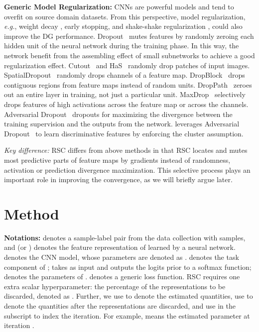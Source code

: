 \documentclass[runningheads]{llncs}
\newcommand{\method}{RSC}
\begin{document}
\textbf{Generic Model Regularization:} CNNs are powerful models and tend to overfit on source domain datasets. From this perspective, model regularization, \textit{e.g.}, weight decay \cite{nowlan1992simplifying}, early stopping, and shake-shake regularization \cite{gastaldi2017shake}, could also improve the DG performance. 
Dropout~\cite{srivastava2014dropout} mutes features by randomly zeroing each hidden unit of the neural network during the training phase. In this way, the network benefit from the assembling effect of small subnetworks to achieve a good regularization effect. Cutout~\cite{devries2017improved} and HaS~\cite{singh2017hide} randomly drop patches of input images. SpatialDropout~\cite{tompson2015efficient} randomly drops channels of a feature map. DropBlock~\cite{ghiasi2018dropblock} drops contiguous regions from feature maps instead of random units.
DropPath~\cite{larsson2016fractalnet} zeroes out an entire layer in training, not just a particular unit. MaxDrop~\cite{park2016analysis} selectively drops features of high activations across the feature map or across the channels. Adversarial Dropout~\cite{park2018adversarial} dropouts for maximizing the divergence between the training supervision and the outputs from the network. \cite{lee2019drop} leverages Adversarial Dropout~\cite{park2018adversarial} to learn discriminative features by enforcing the cluster assumption.


\emph{Key difference:} RSC differs from above methods in that RSC locates and mutes most predictive parts of feature maps by gradients instead of randomness, activation or prediction divergence maximization. This selective process plays an important role in improving the convergence, as we will briefly argue later.  
\section{Method}
\label{sec:method}


\textbf{Notations:} 
 denotes a sample-label pair from the data collection  with  samples, 
and  (or ) denotes the feature representation of  learned by a neural network.
 denotes the CNN model, whose parameters are denoted as .
 denotes the task component of ;  takes  as input and outputs the logits prior to a softmax function; 
 denotes the parameters of . 
 denotes a generic loss function. 
\method{} requires one extra scalar hyperparameter: the percentage of the representations to be discarded, denoted as . 
Further, we use  to denote the estimated quantities, 
use  to denote the quantities after the representations are discarded,
and use  in the subscript to index the iteration. 
For example,  means the estimated parameter at iteration . 
\end{document}
